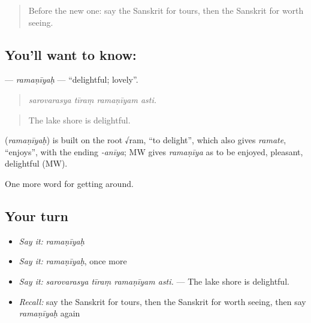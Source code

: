 \label{lesson:SA-C424-ramaniyah}



\begin{quote}
Before the new one: say the Sanskrit for tours, then the Sanskrit for worth seeing.
\end{quote}

\subsection*{You'll want to know: }
\textbf{} — \emph{ramaṇīyaḥ} — \textquotedblleft{}delightful; lovely\textquotedblright{}.

\begin{quote}
   
\end{quote}

\begin{quote}
\emph{sarovarasya tīraṃ ramaṇīyam asti.}
\end{quote}

\begin{quote}
The lake shore is delightful.
\end{quote}

\begin{cousinweb}
\textbf{} (\emph{ramaṇīyaḥ}) is built on the root √ram, \textquotedblleft{}to delight\textquotedblright{}, which also gives \emph{ramate}, \textquotedblleft{}enjoys\textquotedblright{}, with the ending \emph{-anīya}; MW gives \emph{ramaṇīya} as to be enjoyed, pleasant, delightful (MW).
\end{cousinweb}

\begin{grammarlens}[title={What you've built}]
One more word for getting around.
\end{grammarlens}

\subsection*{Your turn}
\begin{itemize}
\raggedright
  \item \emph{Say it:} \emph{ramaṇīyaḥ}
  \item \emph{Say it:} \emph{ramaṇīyaḥ}, once more
  \item \emph{Say it:} \emph{sarovarasya tīraṃ ramaṇīyam asti.} — The lake shore is delightful.
  \item \emph{Recall:} say the Sanskrit for tours, then the Sanskrit for worth seeing, then say \emph{ramaṇīyaḥ} again
\end{itemize}

